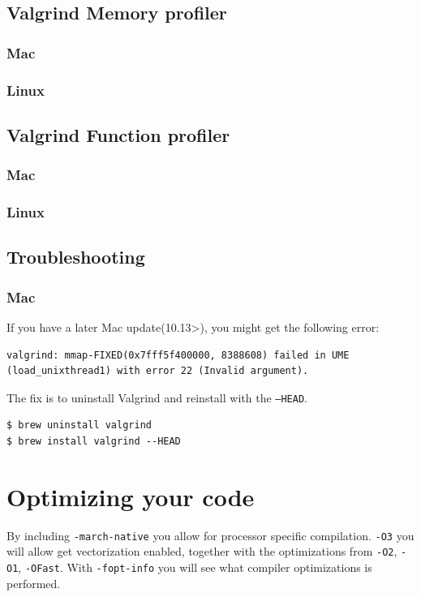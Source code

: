 \documentclass[11pt]{article}
\begin{document}
\subsection{Valgrind Memory profiler}
\subsubsection{Mac}
\subsubsection{Linux}


\subsection{Valgrind Function profiler}
\subsubsection{Mac}
\subsubsection{Linux}

\subsection{Troubleshooting}
\subsubsection{Mac}
If you have a later Mac update(10.13>), you might get the following error:
\begin{lstlisting}
valgrind: mmap-FIXED(0x7fff5f400000, 8388608) failed in UME (load_unixthread1) with error 22 (Invalid argument).
\end{lstlisting}
The fix is to uninstall Valgrind and reinstall with the \texttt{--HEAD}.
\begin{lstlisting}
$ brew uninstall valgrind
$ brew install valgrind --HEAD
\end{lstlisting}

\section{Optimizing your code}
By including \texttt{-march-native} you allow for processor specific compilation. \texttt{-O3} you will allow get vectorization enabled, together with the optimizations from \texttt{-O2}, \texttt{-O1}, \texttt{-OFast}. With \texttt{-fopt-info} you will see what compiler optimizations is performed.
\end{document}
